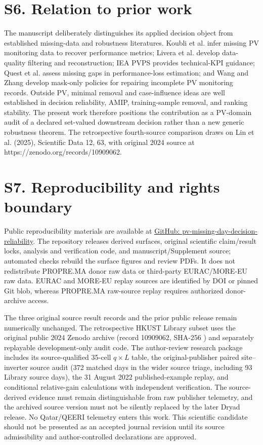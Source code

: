 \documentclass[11pt]{article}
\begin{document}
\section*{S6. Relation to prior work}
The manuscript deliberately distinguishes its applied decision object from established missing-data and robustness literatures. Koubli et al. infer missing PV monitoring data to recover performance metrics; Livera et al. develop data-quality filtering and reconstruction; IEA PVPS provides technical-KPI guidance; Quest et al. assess missing gaps in performance-loss estimation; and Wang and Zhang develop mask-only policies for repairing incomplete PV monitoring records. Outside PV, minimal removal and case-influence ideas are well established in decision reliability, AMIP, training-sample removal, and ranking stability. The present work therefore positions the contribution as a PV-domain audit of a declared set-valued downstream decision rather than a new generic robustness theorem. The retrospective fourth-source comparison draws on Lin et al. (2025), Scientific Data 12, 63, with original 2024 source at https://zenodo.org/records/10909062.

\section*{S7. Reproducibility and rights boundary}
Public reproducibility materials are available at \href{https://github.com/shaikhamalkawi-ux/pv-missing-day-decision-reliability}{GitHub: pv-missing-day-decision-reliability}. The repository releases derived surfaces, original scientific claim/result locks, analysis and verification code, and manuscript/Supplement source; automated checks rebuild the surface figures and review PDFs. It does not redistribute PROPRE.MA donor raw data or third-party EURAC/MORE-EU raw data. EURAC and MORE-EU replay sources are identified by DOI or pinned Git blob, whereas PROPRE.MA raw-source replay requires authorized donor-archive access.

The three original source result records and the prior public release remain numerically unchanged. The retrospective HKUST Library subset uses the original public 2024 Zenodo archive (record 10909062, SHA-256 \texttt{}) and separately replayable development-only audit code. The author-review research package includes its source-qualified 35-cell $q\times L$ table, the original-publisher paired site--inverter source audit (372 matched days in the wider source triage, including 93 Library source days), the 31 August 2022 published-example replay, and conditional relative-gain calculations with independent verification. The source-derived evidence must remain distinguishable from raw publisher telemetry, and the archived source version must not be silently replaced by the later Dryad release. No Qatar/QEERI telemetry enters this work. This scientific candidate should not be presented as an accepted journal revision until its source admissibility and author-controlled declarations are approved.
\end{document}
